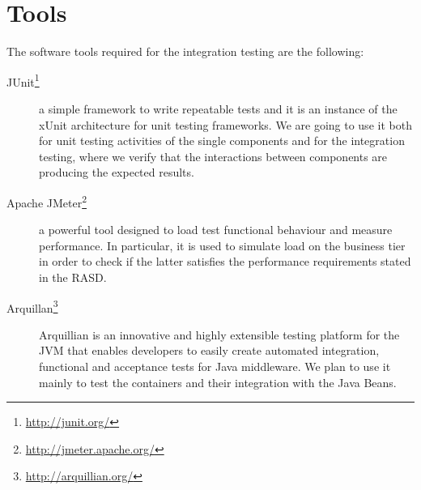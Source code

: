 \section{Tools}
The software tools required for the integration testing are the following:

\begin{description}

    \item[JUnit\footnote{\url{http://junit.org/}}]
    a simple framework to write repeatable tests and it is an instance of the xUnit architecture for unit testing frameworks.
    We are going to use it both for unit testing activities of the single components and for the integration testing, where we verify that the interactions between components are producing the expected results.

    \item[Apache JMeter\footnote{\url{http://jmeter.apache.org/}}]
    a powerful tool designed to load test functional behaviour and measure performance.
    In particular, it is used to simulate load on the business tier in order to check if the latter satisfies the performance requirements stated in the RASD.

	\item[Arquillan\footnote{\url{http://arquillian.org/}}]
    Arquillian is an innovative and highly extensible testing platform for the JVM that enables developers to easily create automated integration, functional and acceptance tests for Java middleware.
    We plan to use it mainly to test the containers and their integration with the Java Beans.

\end{description}
